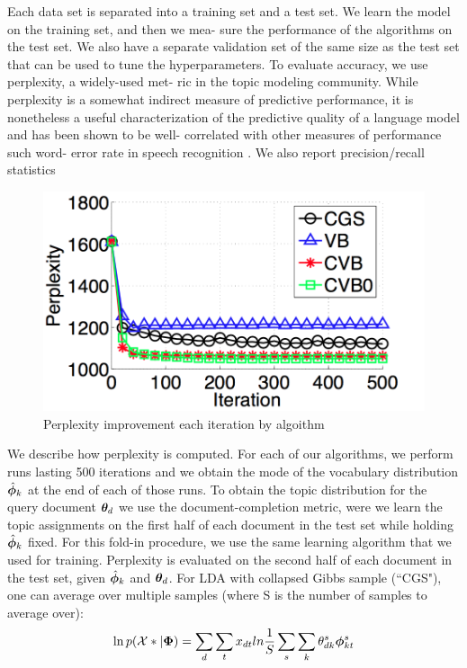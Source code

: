 Each data set is separated into a training set and a test set. We learn the model on the training set, and then we mea- sure the performance of the algorithms on the test set. We also have a separate validation set of the same size as the test set that can be used to tune the hyperparameters. To evaluate accuracy, we use perplexity, a widely-used met- ric in the topic modeling community. While perplexity is a somewhat indirect measure of predictive performance, it is nonetheless a useful characterization of the predictive quality of a language model and has been shown to be well- correlated with other measures of performance such word- error rate in speech recognition . We also report precision/recall statistics

\begin{figure}
  \centering
    \hspace*{-1.5cm}\includegraphics[height=0.33\textheight]{./Chap1/plots/figs/fig2.png}
  \caption{Perplexity improvement each iteration by algoithm}
  \label{fig:chap1-fig2}
\end{figure}

We describe how perplexity is computed. For each of our algorithms, we perform runs lasting 500 iterations and we obtain the mode of the vocabulary distribution $\hat{{ \bm \phi }}_k$ at the end of each of those runs. To obtain the topic distribution for the query document ${ \bm \theta_d }$ we use the document-completion metric, were we learn the topic assignments on the
first half of each document in the test set while holding $\hat{{ \bm \phi }}_k$ 
fixed. For this fold-in procedure, we use the same learning algorithm that we used for training. Perplexity is evaluated on the second half of each document in the test set, given $\hat{{ \bm \phi }}_k$  and ${ \bm \theta_d }$. For LDA with collapsed Gibbs sample (``CGS"), one can average over multiple samples (where S is the number of samples to average over):
\begin{equation}
\ln p(\mathcal{X}*|{ \bm \Phi }) = \sum_{d} \sum_{t} x_{dt} ln \frac{1}{ {S} }\sum_s \sum_k \theta_{dk}^s { \bm \phi }_{kt}^s
\end{equation}


